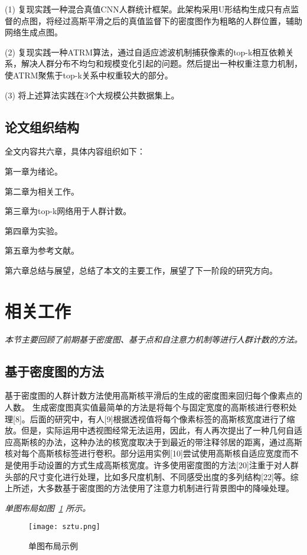 (1) 复现实践一种混合真值CNN人群统计框架。此架构采用U形结构生成只有点监督的点图，将经过高斯平滑之后的真值监督下的密度图作为粗略的人群位置，辅助网络生成点图。\par
(2) 复现实践一种ATRM算法，通过自适应滤波机制捕获像素的top-k相互依赖关系，解决人群分布不均匀和规模变化引起的问题。然后提出一种权重注意力机制，使ATRM聚焦于top-k关系中权重较大的部分。\par
(3) 将上述算法实践在3个大规模公共数据集上。


\subsection{论文组织结构}

全文内容共六章，具体内容组织如下：

第一章为绪论。

第二章为相关工作。

第三章为top-k网络用于人群计数。

第四章为实验。

第五章为参考文献。

第六章总结与展望，总结了本文的主要工作，展望了下一阶段的研究方向。

\newpage
\section{相关工作}
\label{sec.figure}

\emph{本节主要回顾了前期基于密度图、基于点和自注意力机制等进行人群计数的方法。}
\subsection{基于密度图的方法}
基于密度图的人群计数方法使用高斯核平滑后的生成的密度图来回归每个像素点的人数。
生成密度图真实值最简单的方法是将每个与固定宽度的高斯核进行卷积处理[8]。后面的研究中，有人[9]根据透视值将每个像素标签的高斯核宽度进行了缩放。但是，实际运用中透视图经常无法运用，因此，有人再次提出了一种几何自适应高斯核的办法，这种办法的核宽度取决于到最近的带注释邻居的距离，通过高斯核对每个高斯核标签进行卷积。部分运用实例[10]尝试使用高斯核自适应宽度而不是使用手动设置的方式生成高斯核宽度。许多使用密度图的方法[20]注重于对人群头部的尺寸变化进行处理，比如多尺度机制、不同感受出度的多列结构[22]等。综上所述，大多数基于密度图的方法使用了注意力机制进行背景图中的降噪处理。
\lipsum

\emph{单图布局如图~\ref{F.sztu_single} 所示。}

\begin{figure}[hbt]
\centering
\texttt{[image: sztu.png]}
\caption{单图布局示例}
\label{F.sztu_single}
\end{figure}

